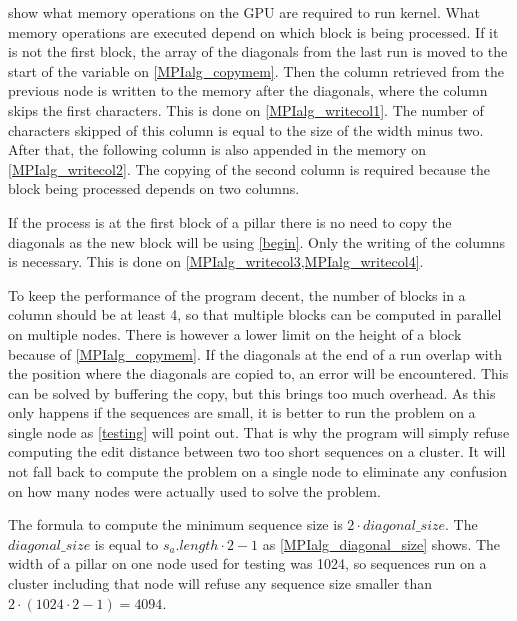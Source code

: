  show what memory operations on the GPU are required to run kernel.
What memory operations are executed depend on which block is being processed.
If it is not the first block, the array of the diagonals from the last run is moved to the start of the variable on \cref{MPIalg_copymem}.
Then the column retrieved from the previous node is written to the memory after the diagonals, where the column skips the first characters.
This is done on \cref{MPIalg_writecol1}.
The number of characters skipped of this column is equal to the size of the width minus two.
After that, the following column is also appended in the memory on \cref{MPIalg_writecol2}.
The copying of the second column is required because the block being processed depends on two columns.

If the process is at the first block of a pillar there is no need to copy the diagonals as the new block will be using \cref{begin}.
Only the writing of the columns is necessary.
This is done on \cref{MPIalg_writecol3,MPIalg_writecol4}.

To keep the performance of the program decent, the number of blocks in a column should be at least 4, so that multiple blocks can be computed in parallel on multiple nodes.
There is however a lower limit on the height of a block because of \cref{MPIalg_copymem}.
If the diagonals at the end of a run overlap with the position where the diagonals are copied to, an error will be encountered.
This can be solved by buffering the copy, but this brings too much overhead.
As this only happens if the sequences are small, it is better to run the problem on a single node as \cref{testing} will point out.
That is why the program will simply refuse computing the edit distance between two too short sequences on a cluster.
It will not fall back to compute the problem on a single node to eliminate any confusion on how many nodes were actually used to solve the problem.

The formula to compute the minimum sequence size is $2 \cdot diagonal\_size$.
The $diagonal\_size$ is equal to $s_a.length \cdot 2 - 1$ as \cref{MPIalg_diagonal_size} shows.
The width of a pillar on one node used for testing was 1024, so sequences run on a cluster including that node will refuse any sequence size smaller than $2 \cdot (1024 \cdot 2 - 1) = 4094$.

